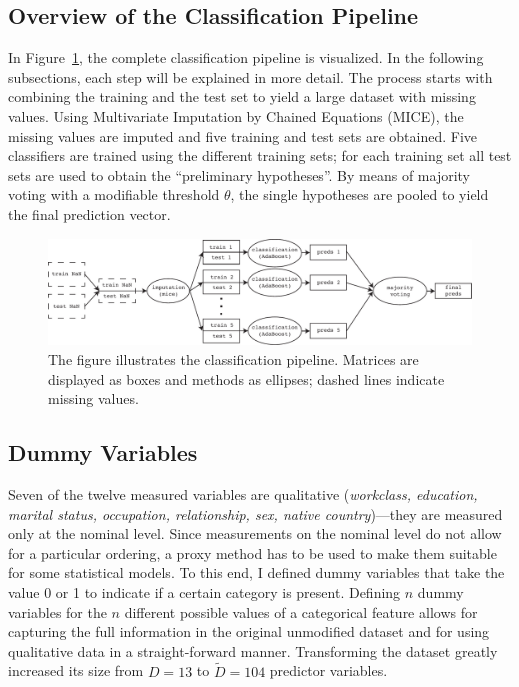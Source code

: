 \documentclass[a4paper,11pt]{article}
\begin{document}
\subsection{Overview of the Classification Pipeline}

In Figure~\ref{fig:pipeline}, the complete classification pipeline is
visualized. In the following subsections, each step will be explained
in more detail. The process starts with combining the training and the
test set to yield a large dataset with missing values. Using
Multivariate Imputation by Chained Equations (MICE), the missing
values are imputed and five training and test sets are obtained. Five
classifiers are trained using the different training sets; for each
training set all test sets are used to obtain the ``preliminary
hypotheses''. By means of majority voting with a modifiable threshold
$\theta$, the single hypotheses are pooled to yield the final
prediction vector.

\begin{figure}[h!]
\begin{center}
\includegraphics[width=1\columnwidth]{pipeline}
\caption{{\label{fig:pipeline} The figure illustrates the
    classification pipeline. Matrices are displayed as boxes and
    methods as ellipses; dashed lines indicate missing values.%
  }}
\end{center}
\end{figure}

\subsection{Dummy Variables}

Seven of the twelve measured variables are qualitative (\emph{workclass,
education, marital status, occupation, relationship, sex, native
country})---they are measured only at the nominal level. Since
measurements on the nominal level do not allow for a particular
ordering, a proxy method has to be used to make them suitable for
some statistical models. To this end, I defined dummy variables that take
the value 0 or 1 to indicate if a certain category is
present. Defining $n$ dummy variables for the $n$ different possible
values of a categorical feature allows for capturing the full
information in the original unmodified dataset and for using
qualitative data in a straight-forward manner.
Transforming the dataset greatly increased its size from $D = 13$ to
$\tilde{D} = 104$ predictor variables.
\end{document}
